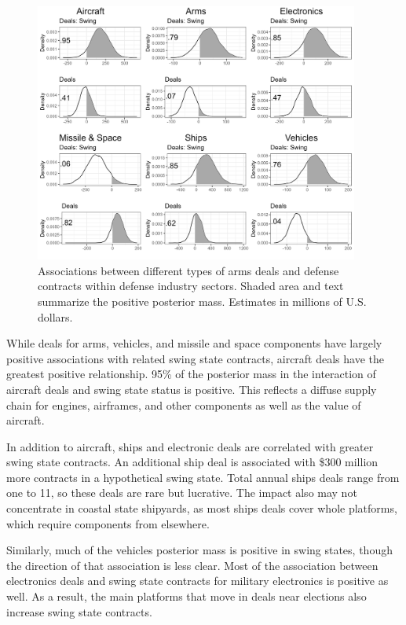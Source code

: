 \documentclass[12pt]{article}
\begin{document}
\begin{figure}[htpb]
	\centering
		\includegraphics[width=0.95\textwidth]{../figures/me-deals-sector.png}
	\caption{Associations between different types of arms deals and defense contracts within defense industry sectors. Shaded area and text summarize the positive posterior mass. Estimates in millions of U.S. dollars.}
	\label{fig:me-deals-sector}
\end{figure}


While deals for arms, vehicles, and missile and space components have largely positive associations with related swing state contracts, aircraft deals have the greatest positive relationship. 
95\% of the posterior mass in the interaction of aircraft deals and swing state status is positive.
This reflects a diffuse supply chain for engines, airframes, and other components as well as the value of aircraft.


In addition to aircraft, ships and electronic deals are correlated with greater swing state contracts. 
An additional ship deal is associated with \$300 million more contracts in a hypothetical swing state. 
Total annual ships deals range from one to 11, so these deals are rare but lucrative. 
The impact also may not concentrate in coastal state shipyards, as most ships deals cover whole platforms, which require components from elsewhere. 


Similarly, much of the vehicles posterior mass is positive in swing states, though the direction of that association is less clear.
Most of the association between electronics deals and swing state contracts for military electronics is positive as well.
As a result, the main platforms that move in deals near elections also increase swing state contracts. 
\end{document}
